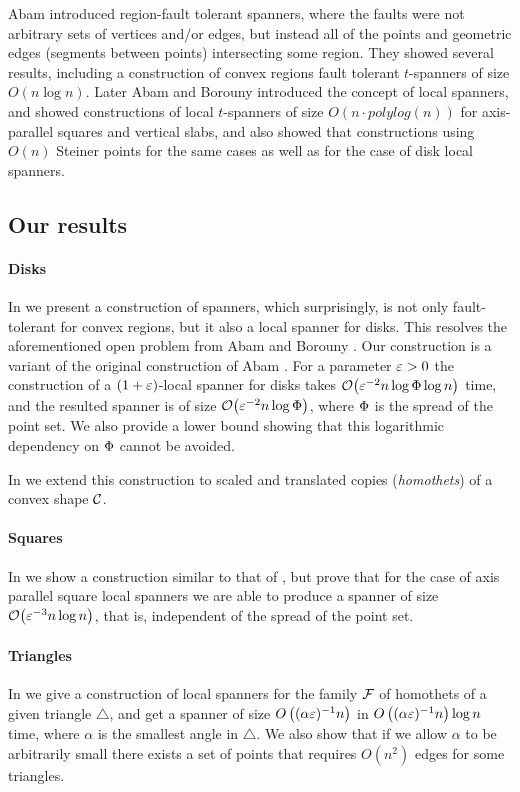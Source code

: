 \documentclass[12pt]{article}%
\begin{document}
Abam \etal\cite{abfg-rftgs-09} introduced region-fault tolerant
spanners, where the faults were not arbitrary sets of vertices and/or
edges, but instead all of the points and geometric edges (segments
between points) intersecting some region. They showed several results,
including a construction of convex regions fault tolerant $t$-spanners
of size $O(n\log n)$. Later Abam and Borouny \cite{ab-lgs-21}
introduced the concept of local spanners, and showed constructions of
local $t$-spanners of size $O(n\cdot polylog(n))$ for axis-parallel
squares and vertical slabs, and also showed that constructions using
$O(n)$ Steiner points for the same cases as well as for the case of
disk local spanners.

\subsection*{Our results}

\paragraph{Disks}
In  we present a construction of spanners, which
surprisingly, is not only fault-tolerant for convex regions, but it
also a local spanner for disks. This resolves the aforementioned open
problem from Abam and Borouny \cite{ab-lgs-21}. Our construction is a
variant of the original construction of Abam \etal
\cite{abfg-rftgs-09}. For a parameter $\varepsilon>0$ the construction of a
$(1+\varepsilon)$-local spanner for disks takes
$\Of\pth{ \eps^{-2} n\log \spread \log n }$ time, and the resulted
spanner is of size $\Of\pth{ \eps^{-2} n\log \spread }$, where
$\Phi$ is the spread of the point set. We also provide a lower
bound showing that this logarithmic dependency on $\Phi$ cannot be
avoided.

In  we extend this construction to scaled and
translated copies (\emph{homothets}) of a convex shape $\mathcal{C}$.

\paragraph{Squares}
In  we show a construction similar to that of
, but prove that for the case of axis parallel square
local spanners we are able to produce a spanner of size
$\Of\pth{\eps^{-3} n \log n}$, that is, independent of the spread of
the point set.

\paragraph{Triangles}
In  we give a construction of local spanners for the
family $\mathcal{F}$ of homothets of a given triangle $\triangle$, and get a
spanner of size $O\left((\alpha\varepsilon)^{-1}n\right)$ in
$O\left((\alpha\varepsilon)^{-1}n\right)\log n$ time, where $\alpha$ is the
smallest angle in $\triangle$. We also show that if we allow $\alpha$
to be arbitrarily small there exists a set of points that requires
$O(n^2)$ edges for some triangles.
\end{document}
